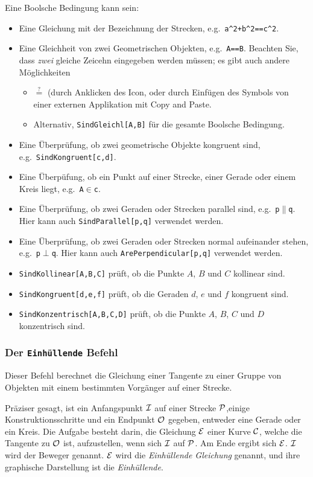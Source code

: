 \documentclass{article}
\begin{document}
Eine Boolsche Bedingung kann sein:
\begin{itemize}
\item Eine Gleichung mit der Bezeichnung der Strecken, e.g.~\texttt{a\^{}2+b\^{}2==c\^{}2}.
\item Eine Gleichheit von zwei Geometrischen Objekten, e.g.~\texttt{A==B}. Beachten Sie, dass \textit{zwei} gleiche Zeicehn eingegeben werden müssen; es gibt auch andere Möglichkeiten
\begin{itemize}
    \item $\stackrel{?}{=}$ (durch Anklicken des \framebox{$\alpha$} Icon, oder durch Einfügen des Symbols von einer externen Applikation mit Copy and Paste.
    \item Alternativ, \texttt{SindGleichl[A,B]} für die gesamte Boolsche Bedingung.
\end{itemize}
\item Eine Überprüfung, ob zwei geometrische Objekte kongruent sind, e.g.~\texttt{SindKongruent[c,d]}.
\item Eine Überpüfung, ob ein Punkt auf einer Strecke, einer Gerade oder einem Kreis liegt, e.g.~\texttt{A$\in$c}.
\item Eine Überprüfung, ob zwei Geraden oder Strecken parallel sind, e.g.~\texttt{p$\parallel$q}. Hier kann auch \texttt{SindParallel[p,q]} verwendet werden.
\item Eine Überprüfung, ob zwei Geraden oder Strecken normal aufeinander stehen, e.g.~\texttt{p$\perp$q}. Hier kann auch \texttt{ArePerpendicular[p,q]} verwendet werden.
\item \texttt{SindKollinear[A,B,C]} prüft, ob die Punkte $A$, $B$ und $C$ kollinear sind.
\item \texttt{SindKongruent[d,e,f]} prüft, ob die Geraden $d$, $e$ und $f$ kongruent sind.
\item \texttt{SindKonzentrisch[A,B,C,D]} prüft, ob die Punkte $A$, $B$, $C$ und $D$ konzentrisch sind.
\end{itemize}

\subsubsection{Der \texttt{Einhüllende} Befehl}

Dieser Befehl berechnet die Gleichung einer Tangente zu einer Gruppe von Objekten mit einem bestimmten Vorgänger auf einer Strecke.

Präziser gesagt, ist ein Anfangspunkt $\cal{I}$ auf einer Strecke $\cal{P}$,einige Konstruktionsschritte und ein Endpunkt $\cal O$ gegeben, entweder eine Gerade oder ein Kreis. Die Aufgabe besteht darin, die Gleichung $\cal E$ einer Kurve $\cal C$, welche die Tangente zu $\cal O$ ist, aufzustellen, wenn sich $\cal I$ auf $\cal P$. Am Ende ergibt sich $\cal E$. $\cal I$ wird der Beweger genannt. $\cal E$ wird die \textit{Einhüllende Gleichung} genannt, und ihre graphische Darstellung ist die \textit{Einhüllende}.
\end{document}
